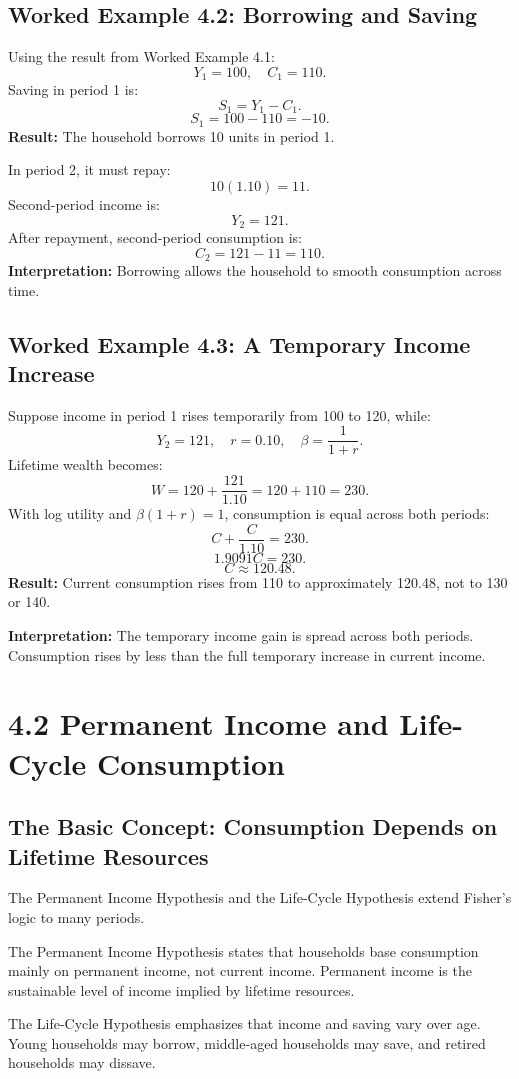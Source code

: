 \documentclass[12pt,a4paper]{article}
\begin{document}
\subsection*{Worked Example 4.2: Borrowing and Saving}
Using the result from Worked Example 4.1:
\[ Y_1 = 100, \quad C_1 = 110. \]
Saving in period 1 is:
\[ S_1 = Y_1 - C_1. \]
\[ S_1 = 100 - 110 = -10. \]
\textbf{Result:} The household borrows 10 units in period 1.

In period 2, it must repay:
\[ 10(1.10) = 11. \]
Second-period income is:
\[ Y_2 = 121. \]
After repayment, second-period consumption is:
\[ C_2 = 121 - 11 = 110. \]
\textbf{Interpretation:} Borrowing allows the household to smooth consumption across time.

\subsection*{Worked Example 4.3: A Temporary Income Increase}
Suppose income in period 1 rises temporarily from 100 to 120, while:
\[ Y_2 = 121, \quad r = 0.10, \quad \beta = \frac{1}{1+r}. \]
Lifetime wealth becomes:
\[ W = 120 + \frac{121}{1.10} = 120 + 110 = 230. \]
With log utility and $\beta(1+r) = 1$, consumption is equal across both periods:
\[ C + \frac{C}{1.10} = 230. \]
\[ 1.9091C = 230. \]
\[ C \approx 120.48. \]
\textbf{Result:} Current consumption rises from 110 to approximately 120.48, not to 130 or 140.

\textbf{Interpretation:} The temporary income gain is spread across both periods. Consumption rises by less than the full temporary increase in current income.

\section*{4.2 Permanent Income and Life-Cycle Consumption}
\subsection*{The Basic Concept: Consumption Depends on Lifetime Resources}
The Permanent Income Hypothesis and the Life-Cycle Hypothesis extend Fisher's logic to many periods.

The Permanent Income Hypothesis states that households base consumption mainly on permanent income, not current income. Permanent income is the sustainable level of income implied by lifetime resources.

The Life-Cycle Hypothesis emphasizes that income and saving vary over age. Young households may borrow, middle-aged households may save, and retired households may dissave.
\end{document}
